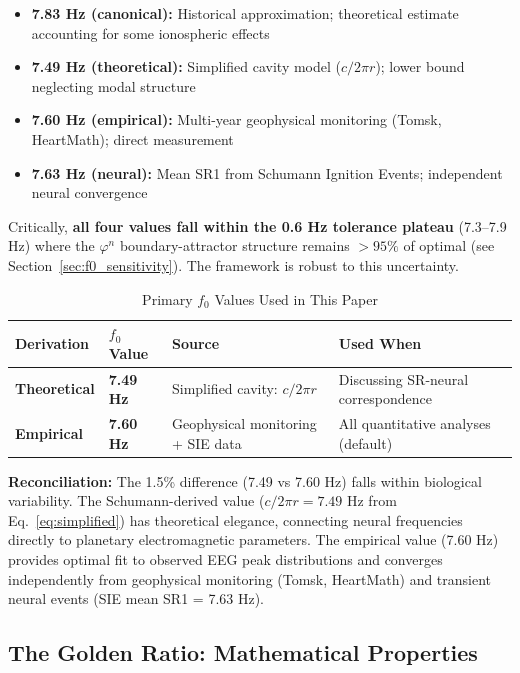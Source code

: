 \documentclass[11pt,a4paper]{article}
\newcommand{\phisym}{\varphi}
\newcommand{\fzero}{f_0}
\begin{document}
\begin{itemize}
    \item \textbf{7.83 Hz (canonical):} Historical approximation; theoretical estimate accounting for some ionospheric effects
    \item \textbf{7.49 Hz (theoretical):} Simplified cavity model ($c/2\pi r$); lower bound neglecting modal structure
    \item \textbf{7.60 Hz (empirical):} Multi-year geophysical monitoring (Tomsk, HeartMath); direct measurement
    \item \textbf{7.63 Hz (neural):} Mean SR1 from Schumann Ignition Events; independent neural convergence
\end{itemize}

Critically, \textbf{all four values fall within the 0.6 Hz tolerance plateau} (7.3--7.9 Hz) where the $\phisym^n$ boundary-attractor structure remains $>95\%$ of optimal (see Section~\ref{sec:f0_sensitivity}). The framework is robust to this uncertainty.

\begin{table}[H]
\centering
\caption{Primary $\fzero$ Values Used in This Paper}
\label{tab:f0_derivations}
\begin{tabular}{@{}llll@{}}
\toprule
Derivation & $\fzero$ Value & Source & Used When \\
\midrule
\textbf{Theoretical} & \textbf{7.49 Hz} & Simplified cavity: $c/2\pi r$ & Discussing SR-neural correspondence \\
\textbf{Empirical} & \textbf{7.60 Hz} & Geophysical monitoring + SIE data & All quantitative analyses (default) \\
\bottomrule
\end{tabular}
\end{table}

\textbf{Reconciliation:} The 1.5\% difference (7.49 vs 7.60 Hz) falls within biological variability. The Schumann-derived value ($c/2\pi r = 7.49$ Hz from Eq.~\ref{eq:simplified}) has theoretical elegance, connecting neural frequencies directly to planetary electromagnetic parameters. The empirical value (7.60 Hz) provides optimal fit to observed EEG peak distributions and converges independently from geophysical monitoring (Tomsk, HeartMath) and transient neural events (SIE mean SR1 = 7.63 Hz).


\subsection{The Golden Ratio: Mathematical Properties}
\end{document}
